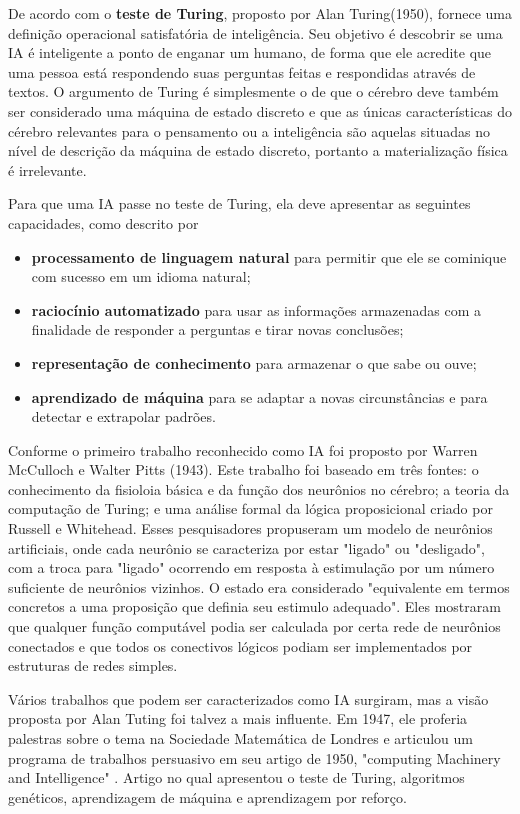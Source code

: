 \documentclass[
	12pt,				%
	openright,			%
	twoside,			%
	a4paper,			%
	english,			%
	french,				%
	spanish,			%
	brazil				%
	]{abntex2}
\begin{document}
De acordo com  o \textbf{teste de Turing}, proposto por Alan Turing(1950), fornece uma definição operacional satisfatória de inteligência. Seu objetivo é descobrir se uma IA é inteligente a ponto de enganar um humano, de forma que ele acredite que uma pessoa está respondendo suas perguntas feitas e respondidas através de textos. O argumento de Turing é simplesmente o de que o cérebro deve também ser considerado uma máquina de estado discreto e que as únicas características do cérebro relevantes para o pensamento ou a inteligência são aquelas situadas no nível de descrição da máquina de estado discreto, portanto a materialização física é irrelevante.

Para que uma IA passe no teste de Turing, ela deve apresentar as seguintes capacidades, como descrito por 
\begin{itemize}
	\item \textbf{processamento de linguagem natural} para permitir que ele se cominique com sucesso em um idioma natural;
	\item \textbf{raciocínio automatizado} para usar as informações armazenadas com a finalidade de responder a perguntas e tirar novas conclusões;
	\item \textbf{representação de conhecimento} para armazenar o que sabe ou ouve;
	\item \textbf{aprendizado de máquina} para se adaptar a novas circunstâncias e para detectar e extrapolar padrões.
\end{itemize}
Conforme  o primeiro trabalho reconhecido como IA foi proposto por Warren McCulloch e Walter Pitts (1943). Este trabalho foi baseado em três fontes: o conhecimento da fisioloia básica e da função dos neurônios no cérebro; a teoria da computação de Turing; e uma análise formal da lógica proposicional criado por Russell e Whitehead. Esses pesquisadores propuseram um modelo de neurônios artificiais, onde cada neurônio se caracteriza por estar "ligado" ou "desligado", com a troca para "ligado" ocorrendo em resposta à estimulação por um número suficiente de neurônios vizinhos. O estado era considerado "equivalente em termos concretos a uma proposição que definia seu estimulo adequado". Eles mostraram que qualquer função computável podia ser calculada por certa rede de neurônios conectados e que todos os conectivos lógicos podiam ser implementados por estruturas de redes simples.

Vários trabalhos que podem ser caracterizados como IA surgiram, mas a visão proposta por Alan Tuting foi talvez a mais influente. Em 1947, ele proferia palestras sobre o tema na Sociedade Matemática de Londres e articulou um programa de trabalhos persuasivo em seu artigo de 1950, "computing Machinery and Intelligence" . Artigo no qual apresentou o teste de Turing, algoritmos genéticos, aprendizagem de máquina e aprendizagem por reforço.
\end{document}
